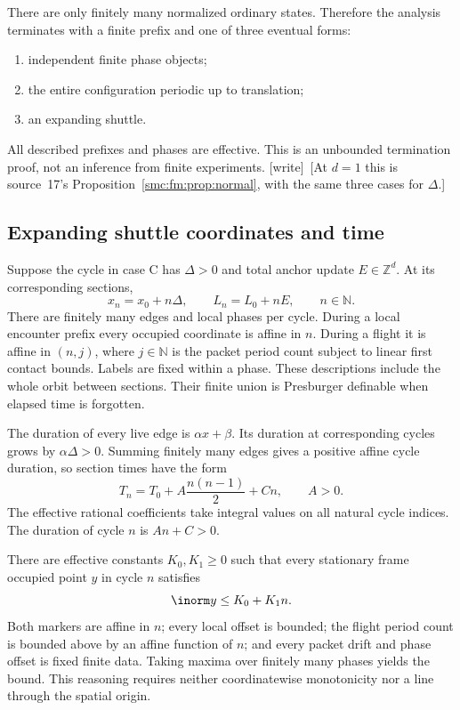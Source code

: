 \documentclass[11pt,letterpaper]{article}
\numberwithin{equation}{section}
\theoremstyle{definition}
\theoremstyle{remark}
\newcommand{\Z}{\mathbb Z}
\newcommand{\NN}{\mathbb N}
\newcommand{\wtag}{\textup{[write]}}
\begin{document}
There are only finitely many normalized ordinary states. Therefore the analysis terminates with a finite prefix and one of three eventual forms:
\begin{enumerate}[label=\Alph*.]
\item independent finite phase objects;
\item the entire configuration periodic up to translation;
\item an expanding shuttle.
\end{enumerate}
All described prefixes and phases are effective. This is an unbounded termination proof, not an inference from finite experiments.
\wtag\ [At $d=1$ this is source~17's Proposition~\ref{smc:fm:prop:normal}, with the same three cases for $\Delta$.]

\subsection{Expanding shuttle coordinates and time}\label{smc:zd:sec:shuttle}
Suppose the cycle in case C has $\Delta>0$ and total anchor update $E\in\Z^d$. At its corresponding sections,
\begin{equation}\label{smc:zd:eq:cycles}
 x_n=x_0+n\Delta,\qquad L_n=L_0+nE,\qquad n\in\NN.
\end{equation}
There are finitely many edges and local phases per cycle. During a local encounter prefix every occupied coordinate is affine in $n$. During a flight it is affine in $(n,j)$, where $j\in\NN$ is the packet period count subject to linear first contact bounds. Labels are fixed within a phase. These descriptions include the whole orbit between sections. Their finite union is Presburger definable when elapsed time is forgotten.

The duration of every live edge is $\alpha x+\beta$. Its duration at corresponding cycles grows by $\alpha\Delta>0$. Summing finitely many edges gives a positive affine cycle duration, so section times have the form
\begin{equation}\label{smc:zd:eq:quadratic}
 T_n=T_0+A\frac{n(n-1)}2+Cn,\qquad A>0.
\end{equation}
The effective rational coefficients take integral values on all natural cycle indices. The duration of cycle $n$ is $An+C>0$.

There are effective constants $K_0,K_1\ge0$ such that every stationary frame occupied point $y$ in cycle $n$ satisfies
\begin{equation}\label{smc:zd:eq:linearbound}
 \inorm y\le K_0+K_1n.
\end{equation}
Both markers are affine in $n$; every local offset is bounded; the flight period count is bounded above by an affine function of $n$; and every packet drift and phase offset is fixed finite data. Taking maxima over finitely many phases yields the bound. This reasoning requires neither coordinatewise monotonicity nor a line through the spatial origin.
\end{document}
